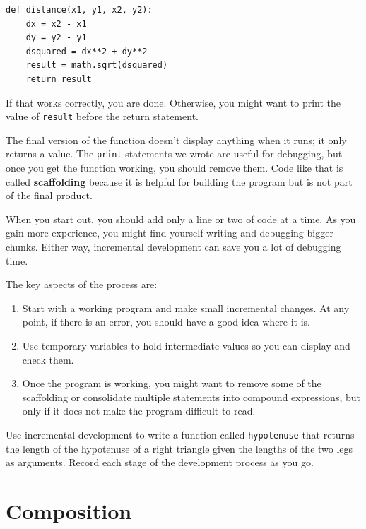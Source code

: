 \documentclass[10pt]{book}
\begin{document}
\begin{verbatim}
def distance(x1, y1, x2, y2):
    dx = x2 - x1
    dy = y2 - y1
    dsquared = dx**2 + dy**2
    result = math.sqrt(dsquared)
    return result
\end{verbatim}
%
If that works correctly, you are done.  Otherwise, you might
want to print the value of {\tt result} before the return
statement.

The final version of the function doesn't display anything when it
runs; it only returns a value.  The {\tt print} statements we wrote
are useful for debugging, but once you get the function working, you
should remove them.  Code like that is called {\bf scaffolding}
because it is helpful for building the program but is not part of the
final product.

When you start out, you should add only a line or two of code at a
time.  As you gain more experience, you might find yourself writing
and debugging bigger chunks.  Either way, incremental development
can save you a lot of debugging time.

The key aspects of the process are:

\begin{enumerate}

\item Start with a working program and make small incremental changes. 
At any point, if there is an error, you should have a good idea
where it is.

\item Use temporary variables to hold intermediate values so you can
display and check them.

\item Once the program is working, you might want to remove some of
the scaffolding or consolidate multiple statements into compound
expressions, but only if it does not make the program difficult to
read.

\end{enumerate}

\begin{exercise}

Use incremental development to write a function
called {\tt hypotenuse} that returns the length of the hypotenuse of a
right triangle given the lengths of the two legs as arguments.
Record each stage of the development process as you go.
\end{exercise}


\section{Composition}
\end{document}
